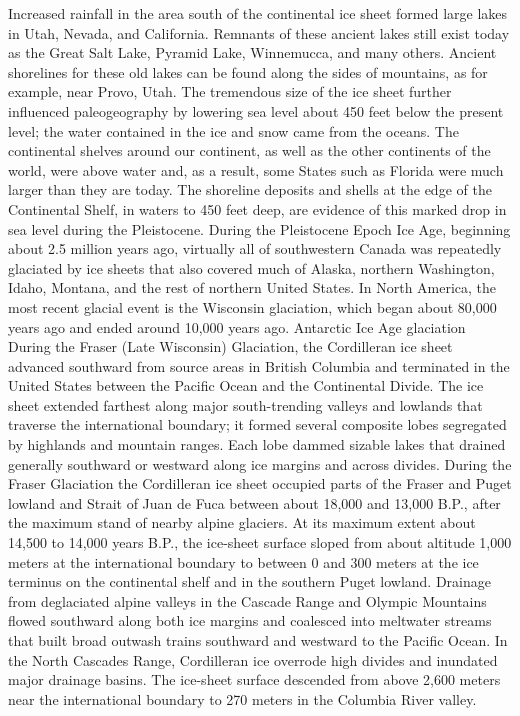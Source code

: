 		\ddd Increased rainfall in the area south of the continental ice sheet formed large lakes in Utah, Nevada, and California. Remnants of these ancient lakes still exist today as the Great Salt Lake, Pyramid Lake, Winnemucca, and many others. Ancient shorelines for these old lakes can be found along the sides of mountains, as for example, near Provo, Utah.
		\ddd The tremendous size of the ice sheet further influenced paleogeography by lowering sea level about 450 feet below the present level; the water contained in the ice and snow came from the oceans. The continental shelves around our continent, as well as the other continents of the world, were above water and, as a result, some States such as Florida were much larger than they are today. The shoreline deposits and shells at the edge of the Continental Shelf, in waters to 450 feet deep, are evidence of this marked drop in sea level during the Pleistocene.
		\ddd During the Pleistocene Epoch Ice Age, beginning about 2.5 million years ago, virtually all of southwestern Canada was repeatedly glaciated by ice sheets that also covered much of Alaska, northern Washington, Idaho, Montana, and the rest of northern United States. In North America, the most recent glacial event is the Wisconsin glaciation, which began about 80,000 years ago and ended around 10,000 years ago.
	\ddd Antarctic Ice Age glaciation During the Fraser (Late Wisconsin) Glaciation, the Cordilleran ice sheet advanced southward from source areas in British Columbia and terminated in the United States between the Pacific Ocean and the Continental Divide. The ice sheet extended farthest along major south-trending valleys and lowlands that traverse the international boundary; it formed several composite lobes segregated by highlands and mountain ranges. Each lobe dammed sizable lakes that drained generally southward or westward along ice margins and across divides.
	\ddd During the Fraser Glaciation the Cordilleran ice sheet occupied parts of the Fraser and Puget lowland and Strait of Juan de Fuca between about 18,000 and 13,000 B.P., after the maximum stand of nearby alpine glaciers. At its maximum extent about 14,500 to 14,000 years B.P., the ice-sheet surface sloped from about altitude 1,000 meters at the international boundary to between 0 and 300 meters at the ice terminus on the continental shelf and in the southern Puget lowland. Drainage from deglaciated alpine valleys in the Cascade Range and Olympic Mountains flowed southward along both ice margins and coalesced into meltwater streams that built broad outwash trains southward and westward to the Pacific Ocean. In the North Cascades Range, Cordilleran ice overrode high divides and inundated major drainage basins. The ice-sheet surface descended from above 2,600 meters near the international boundary to 270 meters in the Columbia River valley.
